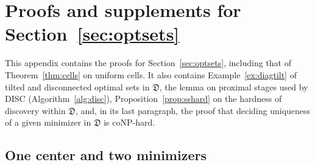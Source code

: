 \section{Proofs and supplements for Section~\ref{sec:optsets}}\label{app:proximal}

This appendix contains the proofs for Section~\ref{sec:optsets}, including
that of Theorem~\ref{thm:cells} on uniform cells. It also contains
Example~\ref{ex:diagtilt} of tilted and disconnected optimal sets in
$\mathfrak D$, the lemma on proximal stages used by DISC
(Algorithm~\ref{alg:disc}), Proposition~\ref{prop:sshard} on the hardness of
discovery within $\mathfrak D$, and, in its last paragraph, the proof that
deciding uniqueness of a given minimizer in $\mathfrak D$ is coNP-hard.

\subsection{One center and two minimizers}

